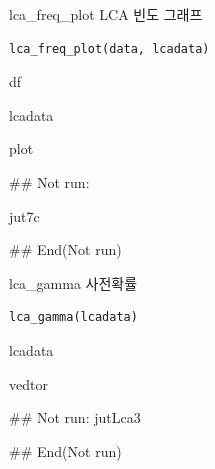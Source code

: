 \documentclass[a4paper]{book}
\begin{document}
%
\begin{Description}
lca\_freq\_plot LCA 빈도 그래프
\end{Description}
%
\begin{Usage}
\begin{verbatim}
lca_freq_plot(data, lcadata)
\end{verbatim}
\end{Usage}
%
\begin{Arguments}
\begin{ldescription}
\item[\code{data}] df

\item[\code{lcadata}] lcadata
\end{ldescription}
\end{Arguments}
%
\begin{Value}
plot
\end{Value}
%
\begin{Examples}
\begin{ExampleCode}
\#\# Not run: 

jut7c %

## End(Not run)
\end{ExampleCode}
\end{Examples}

%
\begin{Description}
lca\_gamma 사전확률
\end{Description}
%
\begin{Usage}
\begin{verbatim}
lca_gamma(lcadata)
\end{verbatim}
\end{Usage}
%
\begin{Arguments}
\begin{ldescription}
\item[\code{lcadata}] lcadata
\end{ldescription}
\end{Arguments}
%
\begin{Value}
vedtor
\end{Value}
%
\begin{Examples}
\begin{ExampleCode}
\#\# Not run: 
jutLca3%

## End(Not run)
\end{ExampleCode}
\end{Examples}
\end{document}
